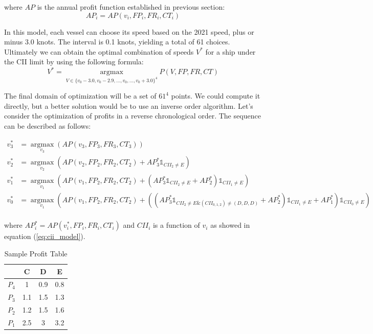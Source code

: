 \documentclass[a4paper,12pt]{article}
\begin{document}
where $AP$ is the annual profit function established in previous section:
\begin{equation}
	AP_i = AP(v_i, FP_i, FR_i, CT_i)
\end{equation}

In this model, each vessel can choose its speed based on the 2021 speed, plus or minus 3.0 knots.
The interval is 0.1 knots, yielding a total of 61 choices.
Ultimately we can obtain the optimal combination of speeds $V^\ast$ for a ship under the CII limit by using the following formula:
\begin{equation}
	\label{eq:vast}
	V^\ast = \operatorname*{argmax}_{V\in \{v_0-3.0, v_0-2.9, ..., v_0,...,v_0+3.0 \}^4} P(V, FP, FR, CT)
\end{equation}


The final domain of optimization will be a set of $61^4$ points.
We could compute it directly, but a better solution would be to use an inverse order algorithm.
Let's consider the optimization of profits in a reverse chronological order.
The sequence can be described as follows:

\begin{align*}
	v_3^\ast & = \operatorname*{argmax}_{v_3} (AP(v_3, FP_3, FR_3, CT_3))                                                                                                                                                    \\
	v_2^\ast & = \operatorname*{argmax}_{v_2}  (AP(v_2, FP_2, FR_2, CT_2)+AP_3^\ast \mathds{1} _{CII_2 \neq E} )                                                                                                             \\
	v_1^\ast & = \operatorname*{argmax}_{v_1}  (AP(v_1, FP_2, FR_2, CT_2)+(AP_3^\ast \mathds{1} _{CII_2 \neq E}+ AP_2^\ast )\mathds{1} _{CII_1 \neq E} )                                                                     \\
	v_0^\ast & = \operatorname*{argmax}_{v_1}  (AP(v_1, FP_2, FR_2, CT_2)+((AP_3^\ast \mathds{1} _{CII_2 \neq E \& (CII_{0,1,2}) \neq (D,D,D)}+ AP_2^\ast)\mathds{1} _{CII_1 \neq E} +AP_1^\ast )\mathds{1} _{CII_0 \neq E}) \\
\end{align*}

where $AP_i^\ast = AP(v_i^\ast, FP_i, FR_i, CT_i)$ and $CII_i$ is a function of $v_i$ as showed in equation (\ref{eq:cii_model}).\\

\begin{table}[h!]
	\centering
	\begin{tabular}{|c|c|c|c|}
		\hline
		      & C   & D   & E   \\
		\hline
		$P_4$ & 1   & 0.9 & 0.8 \\
		\hline
		$P_3$ & 1.1 & 1.5 & 1.3 \\
		\hline
		$P_2$ & 1.2 & 1.5 & 1.6 \\
		\hline
		$P_1$ & 2.5 & 3   & 3.2 \\
		\hline
	\end{tabular}
	\caption{Sample Profit Table}
	\label{tb:sample_profit}
\end{table}
\end{document}
